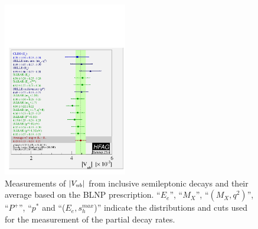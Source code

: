 \begin{figure}
\begin{center}
\includegraphics[width=0.48\textwidth]{figures/slb/vub_clnu_mc_twomu_asym_BLNP.pdf}
\end{center}
\caption{Measurements of $|V_{ub}|$ from inclusive semileptonic decays 
and their average based on the BLNP prescription.
``$E_e$'', ``$M_X$'', ``$(M_X,q^2)$'', ``$P^+$'', ``$p^*$ and ``($E_e,s^{max}_h$)'' indicate the 
distributions and cuts used for the measurement of the partial decay rates.}
\label{fig:BLNP}
\end{figure}

